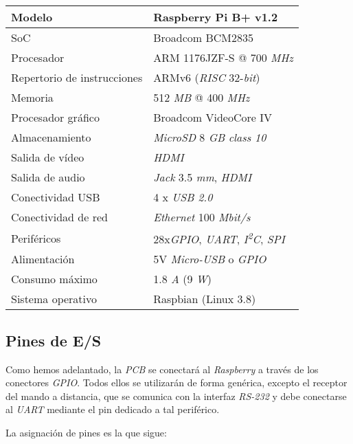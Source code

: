 \begin{center}
	\begin{tabular}{|l|l|}
		\hline Modelo & Raspberry Pi B+ v1.2 \\
		\hline SoC & Broadcom BCM2835 \\
		\hline Procesador & ARM 1176JZF-S @ 700 \textit{MHz} \\
		\hline Repertorio de instrucciones & ARMv6 (\textit{RISC} 32-\textit{bit}) \\
		\hline Memoria & 512 \textit{MB} @ 400 \textit{MHz} \\
		\hline Procesador gráfico & Broadcom VideoCore IV \\ 		
		\hline Almacenamiento & \textit{MicroSD} 8 \textit{GB} \textit{class 10} \\
		\hline Salida de vídeo & \textit{HDMI} \\
		\hline Salida de audio & \textit{Jack} 3.5 \textit{mm}, \textit{HDMI} \\
		\hline Conectividad USB & 4 x \textit{USB 2.0} \\
		\hline Conectividad de red & \textit{Ethernet} 100 \textit{Mbit/s} \\
		\hline Periféricos & 28x\textit{GPIO}, \textit{UART}, \textit{I\textsuperscript{2}C}, \textit{SPI} \\ 
		\hline Alimentación & 5V \textit{Micro-USB} o \textit{GPIO} \\
		\hline Consumo máximo & 1.8 \textit{A} (9 \textit{W}) \\ 
		\hline Sistema operativo & Raspbian (Linux 3.8) \\
		\hline 
	\end{tabular} 
\end{center}

\subsection{Pines de E/S}

Como hemos adelantado, la \textit{PCB} se conectará al \textit{Raspberry} a través de los conectores \textit{GPIO}. Todos ellos se utilizarán de forma genérica, excepto el receptor del mando a distancia, que se comunica con la interfaz \textit{RS-232} y debe conectarse al \textit{UART} mediante el pin dedicado a tal periférico.

La asignación de pines es la que sigue:


